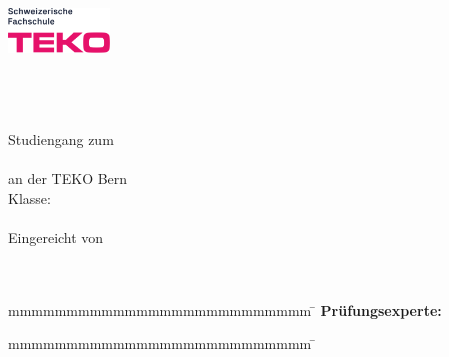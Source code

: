 
\begin{titlepage}
    \includegraphics[width=2.7cm]{../content/images/teko.png}
	\enlargethispage{20mm}
	\begin{center}
		\vspace*{12mm}	{\large\normalfont \arbeit}\\
		\vspace*{12mm}	{\huge\bfseries \thema }\\
		\vspace*{3mm}	{\large\bfseries \subthema }\\
    \vspace*{12mm}  Studiengang zum \\
		\vspace*{3mm}	  \studiengang\\
    \vspace*{3mm}   an der TEKO Bern\\
    \vspace*{3mm}   Klasse:\\ 
    \vspace*{2mm}   \studienjahrgang\\
		\vspace*{12mm}	Eingereicht von\\
		\vspace*{3mm} 	{\large\normalfont \autor}\\
		\vspace*{12mm}	\datumAbgabe\\
	\end{center}
	\vspace{2cm}
	\begin{figure}[htp]
	\end{figure}
	\vfill
	\begin{spacing}{1.2}
		\begin{tabbing}
			mmmmmmmmmmmmmmmmmmmmmmmmmm      \= \kill
			\textbf{Prüfungsexperte:}                 \>  \gutachter
		\end{tabbing}
    \begin{tabbing}
      mmmmmmmmmmmmmmmmmmmmmmmmmm      \= \kill
    \end{tabbing}
		\end{spacing}
		\vspace*{20mm}
\end{titlepage}
